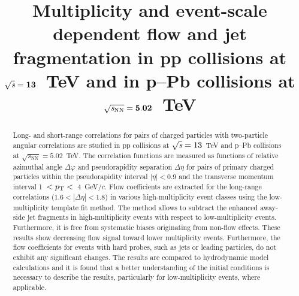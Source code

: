 \documentclass[ALICE,manyauthors]{cernphprep}
\begin{document}
\begin{titlepage}

\PHyear{}
\PHdate{\today}
%

\title{Multiplicity and event-scale dependent flow and jet fragmentation in pp collisions at ${\sqrt{{\textit s}}}=\mathbf{13}$~TeV and in p--Pb collisions at ${\sqrt{{\textit s_\mathrm{NN}}}} = \mathbf{5.02}$~TeV}


\begin{abstract}
%
Long- and short-range correlations for pairs of charged particles with two-particle angular correlations are studied in pp collisions at ${\sqrt{{\textit s}}}=13$~TeV and p--Pb collisions at ${\sqrt{s_\mathrm{NN}}} = 5.02$~TeV. The correlation functions are measured as functions of relative azimuthal angle $\Delta\varphi$ and pseudorapidity separation $\Delta\eta$ for pairs of primary charged particles within the pseudorapidity interval $|\eta| < 0.9$ and the transverse momentum interval 1~$ < p_\mathrm{T} < $~4~GeV/$c$.
Flow coefficients are extracted for the long-range correlations ($1.6 < |\Delta\eta| <1.8$) in various high-multiplicity event classes using the low-multiplicity template fit method. The method allows to subtract the enhanced away-side jet fragments in high-multiplicity events with respect to low-multiplicity events. Furthermore, it is free from systematic biases originating from non-flow effects. These results show decreasing flow signal toward lower multiplicity events. Furthermore, the flow coefficients for events with hard probes, such as jets or leading particles, do not exhibit any significant changes. The results are compared to hydrodynamic model calculations and it is found that a better understanding of the initial conditions is necessary to describe the results, particularly for low-multiplicity events, where applicable.





\end{abstract}

\end{titlepage}
\end{document}
